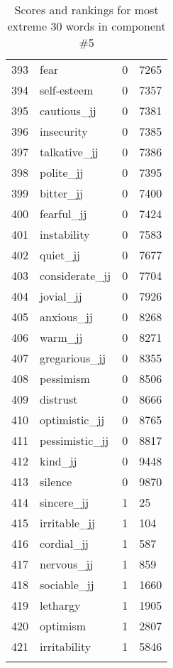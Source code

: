 \begin{longtable}[!htbp]{| rlr@{.}l |}
    393 & fear & 0 & 7265 \\
    394 & self-esteem & 0 & 7357 \\
    395 & cautious\_jj & 0 & 7381 \\
    396 & insecurity & 0 & 7385 \\
    397 & talkative\_jj & 0 & 7386 \\
    398 & polite\_jj & 0 & 7395 \\
    399 & bitter\_jj & 0 & 7400 \\
    400 & fearful\_jj & 0 & 7424 \\
    401 & instability & 0 & 7583 \\
    402 & quiet\_jj & 0 & 7677 \\
    403 & considerate\_jj & 0 & 7704 \\
    404 & jovial\_jj & 0 & 7926 \\
    405 & anxious\_jj & 0 & 8268 \\
    406 & warm\_jj & 0 & 8271 \\
    407 & gregarious\_jj & 0 & 8355 \\
    408 & pessimism & 0 & 8506 \\
    409 & distrust & 0 & 8666 \\
    410 & optimistic\_jj & 0 & 8765 \\
    411 & pessimistic\_jj & 0 & 8817 \\
    412 & kind\_jj & 0 & 9448 \\
    413 & silence & 0 & 9870 \\
    414 & sincere\_jj & 1 & 25 \\
    415 & irritable\_jj & 1 & 104 \\
    416 & cordial\_jj & 1 & 587 \\
    417 & nervous\_jj & 1 & 859 \\
    418 & sociable\_jj & 1 & 1660 \\
    419 & lethargy & 1 & 1905 \\
    420 & optimism & 1 & 2807 \\
    421 & irritability & 1 & 5846 \\
    \hline
    \caption{Scores and rankings for most extreme 30 words in component \#5} \\
\end{longtable}

